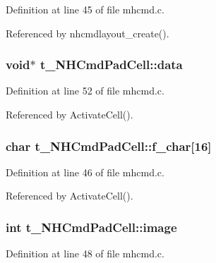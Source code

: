 Definition at line 45 of file mhcmd.\+c.



Referenced by nhcmdlayout\+\_\+create().

\hypertarget{structt__NHCmdPadCell_afbd70b8dedd4bc61fcf142c8b673f02e}{
\subsubsection[{data}]{\setlength{\rightskip}{0pt plus 5cm}void$\ast$ t\+\_\+\+N\+H\+Cmd\+Pad\+Cell\+::data}}\label{structt__NHCmdPadCell_afbd70b8dedd4bc61fcf142c8b673f02e}


Definition at line 52 of file mhcmd.\+c.



Referenced by Activate\+Cell().

\hypertarget{structt__NHCmdPadCell_a03333f37c5d2acc1a4fd2b632526ceac}{
\subsubsection[{f\+\_\+char}]{\setlength{\rightskip}{0pt plus 5cm}char t\+\_\+\+N\+H\+Cmd\+Pad\+Cell\+::f\+\_\+char\mbox{[}16\mbox{]}}}\label{structt__NHCmdPadCell_a03333f37c5d2acc1a4fd2b632526ceac}


Definition at line 46 of file mhcmd.\+c.



Referenced by Activate\+Cell().

\hypertarget{structt__NHCmdPadCell_aef91a1adf61e7b83fff7a4cf53b559a7}{
\subsubsection[{image}]{\setlength{\rightskip}{0pt plus 5cm}int t\+\_\+\+N\+H\+Cmd\+Pad\+Cell\+::image}}\label{structt__NHCmdPadCell_aef91a1adf61e7b83fff7a4cf53b559a7}


Definition at line 48 of file mhcmd.\+c.



